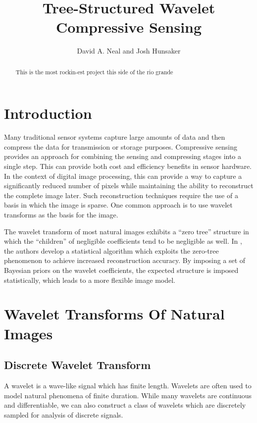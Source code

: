 \documentclass{IEEEtran}
\title{Tree-Structured Wavelet Compressive Sensing}
\author{David A. Neal and Josh Hunsaker}
\begin{document}
\maketitle

\begin{abstract}
This is the most rockin-est project this side of the rio grande
\end{abstract}

\section{Introduction}

Many traditional sensor systems capture large amounts of data and then compress the data for transmission or storage purposes.  Compressive sensing provides an approach for combining the sensing and compressing stages into a single step.  This can provide both cost and efficiency benefits in sensor hardware. In the context of digital image processing, this can provide a way to capture a significantly reduced number of pixels while maintaining the ability to reconstruct the complete image later. Such reconstruction techniques require the use of a basis in which the image is sparse. One common approach is to use wavelet transforms as the basis for the image.

The wavelet transform of most natural images exhibits a ``zero tree'' structure in which the ``children'' of negligible coefficients tend to be negligible as well. In \cite{He09}, the authors develop a statistical algorithm which exploits the zero-tree phenomenon to achieve increased reconstruction accuracy. By imposing a set of Bayesian priors on the wavelet coefficients, the expected structure is imposed statistically, which leads to a more flexible image model.

\section{Wavelet Transforms Of Natural Images}
\label{sec:wavelets}


\subsection{Discrete Wavelet Transform}

A wavelet is a wave-like signal which has finite length. Wavelets are often used to model natural phenomena of finite duration.  While many wavelets are continuous and differentiable, we can also construct a class of wavelets which are discretely sampled for analysis of discrete signals.
\end{document}
